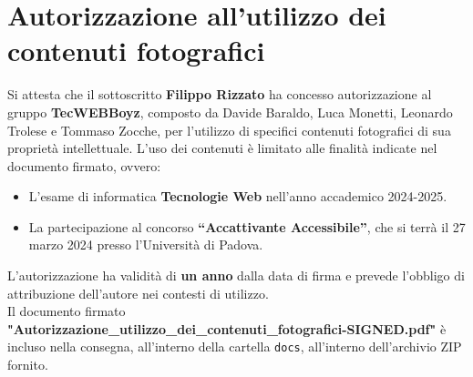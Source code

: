 \section{Autorizzazione all’utilizzo dei contenuti fotografici}

Si attesta che il sottoscritto \textbf{Filippo Rizzato} ha concesso autorizzazione al gruppo \textbf{TecWEBBoyz}, composto da Davide Baraldo, Luca Monetti, Leonardo Trolese e Tommaso Zocche, per l’utilizzo di specifici contenuti fotografici di sua proprietà intellettuale. L’uso dei contenuti è limitato alle finalità indicate nel documento firmato, ovvero:

\begin{itemize}
    \item L’esame di informatica \textbf{Tecnologie Web} nell’anno accademico 2024-2025.
    \item La partecipazione al concorso \textbf{“Accattivante Accessibile”}, che si terrà il 27 marzo 2024 presso l’Università di Padova.
\end{itemize}

L’autorizzazione ha validità di \textbf{un anno} dalla data di firma e prevede l’obbligo di attribuzione dell’autore nei contesti di utilizzo.
\\
Il documento firmato \textbf{"Autorizzazione\_utilizzo\_dei\_contenuti\_fotografici-SIGNED.pdf"} è incluso nella consegna, all’interno della cartella \texttt{docs}, all'interno dell'archivio ZIP fornito.
